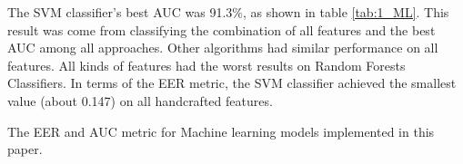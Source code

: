 The SVM classifier’s best AUC was 91.3\%, as shown in table \ref{tab:1_ML}. This result was come from classifying the combination of all features and the best AUC among all approaches. Other algorithms had similar performance on all features. All kinds of features had the worst results on Random Forests Classifiers. In terms of the EER metric, the SVM classifier achieved the smallest value (about 0.147) on all handcrafted features.














 


\begin{center}
	\begin{table}[!t]
	\centering
	\caption{The EER and AUC metric for Machine learning models implemented in this paper.}
	\label{tab:1_ML}
	
	\end{table}
\end{center}

